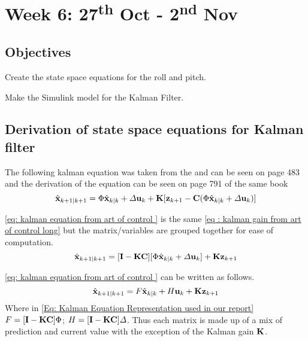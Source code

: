 \chapter{Week 6: 27\textsuperscript{th} Oct  - 2\textsuperscript{nd} Nov }

 \tocless\section{Objectives}



\begin{itemize*}
	\item Create the state space equations for the roll and pitch.
	\item Make the Simulink model for the Kalman Filter.
\end{itemize*}

 \tocless\section{Derivation of state space equations for Kalman filter}
The following kalman equation was taken from the \cite{Artofcontrol} and can be seen on page 483 and the derivation of the equation can be seen on page 791 of the same book
\begin{equation}
\hat{\bf x}_{k+1|k+1} = \Phi\hat{\bf x}_{k|k} + {\bf \varDelta u}_{k} + {\bf K}[{\bf z}_{k+1} - {\bf C}(\Phi \hat{\bf x}_{k|k} + {\bf\varDelta u }_k) ] \label{eq : kalman gain from art of control long}
\end{equation}

\ref{eq: kalman equation from art of control } is the same \ref{eq : kalman gain from art of control long} but the matrix/variables are grouped together for ease of computation.
\begin{equation}
	\hat{\bf x}_{k+1|k+1} = [{\bf I -KC}][\Phi \hat{\bf x}_{k|k} +\varDelta{\bf u}_k] + {\bf Kz}_{k+1} \label{eq: kalman equation from art of control }
\end{equation}

\ref{eq: kalman equation from art of control } can be written as follows.
\begin{equation}
	\hat{\bf x}_{k+1|k+1} = { F}\hat{\bf x}_{k|k} + { H}{\bf u}_k + {\bf Kz}_{k+1} \label{Eq: Kalman Equation Representation used in our report}
\end{equation}
Where in \ref{Eq: Kalman Equation Representation used in our report} ${ F} =  [{\bf I -KC}]\Phi$; $H =  [{\bf I -KC}]\varDelta $. Thus each matrix is made up of a mix of prediction and current value with the exception of the Kalman gain $\bf K$.

